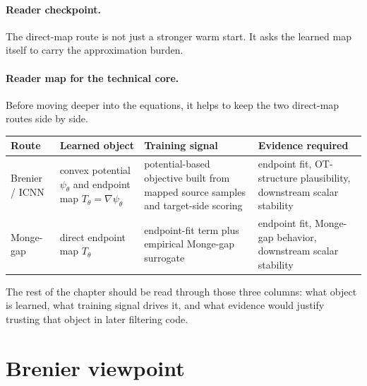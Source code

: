 \paragraph{Reader checkpoint.}
The direct-map route is not just a stronger warm start.  It asks the learned map
itself to carry the approximation burden.

\paragraph{Reader map for the technical core.}
Before moving deeper into the equations, it helps to keep the two direct-map routes
side by side.

\begin{center}
\small
\begin{tabular}{p{} p{} p{} p{}}
\toprule
Route & Learned object & Training signal & Evidence required \\
\midrule
Brenier / ICNN & convex potential \(\psi_\theta\) and endpoint map \(T_\theta=\nabla\psi_\theta\) & potential-based objective built from mapped source samples and target-side scoring & endpoint fit, OT-structure plausibility, downstream scalar stability \\
Monge-gap & direct endpoint map \(T_\theta\) & endpoint-fit term plus empirical Monge-gap surrogate & endpoint fit, Monge-gap behavior, downstream scalar stability \\
\bottomrule
\end{tabular}
\end{center}

The rest of the chapter should be read through those three columns: what object is
learned, what training signal drives it, and what evidence would justify trusting
that object in later filtering code.

\section{Brenier viewpoint}
\label{sec:bf-neural-ot-direct-brenier}

